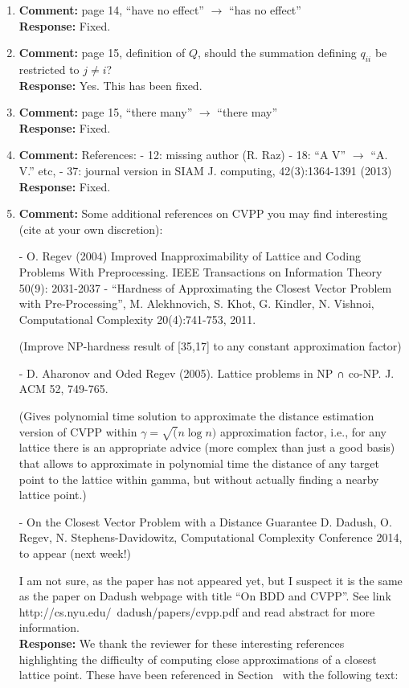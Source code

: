 \documentclass[a4paper,10pt]{article}
\begin{document}
\begin{enumerate}
\item\textbf{Comment:}  
page 14, ``have no effect'' $\to$ ``has no effect'' 
\\\textbf{Response:}
Fixed.

\item\textbf{Comment:}  
page 15, definition of $Q$, should the summation defining $q_{ii}$ be restricted to $j\neq i$? 
\\\textbf{Response:}
Yes. This has been fixed.

\item\textbf{Comment:}  
page 15, ``there many'' $\to$ ``there may'' 
\\\textbf{Response:}
Fixed.

\item\textbf{Comment:}  
References: 
- 12: missing author (R. Raz) 
- 18: ``A V'' $\to$ ``A. V.'' etc, 
- 37: journal version in SIAM J. computing, 42(3):1364-1391 (2013) 
\\\textbf{Response:}
Fixed.

\item\textbf{Comment:}  
Some additional references on CVPP you may find interesting 
(cite at your own discretion): 

- O. Regev (2004) Improved Inapproximability of Lattice and Coding Problems With Preprocessing. IEEE Transactions on Information Theory 50(9): 2031-2037 
- ``Hardness of Approximating the Closest Vector Problem with Pre-Processing'', M. Alekhnovich, S. Khot, G. Kindler, N. Vishnoi, Computational Complexity 20(4):741-753, 2011. 

(Improve NP-hardness result of [35,17] to any constant approximation factor) 

- D. Aharonov and Oded Regev (2005). Lattice problems in NP ∩ co-NP. J. ACM 52, 749-765. 

(Gives polynomial time solution to approximate the distance estimation version of CVPP within $\gamma=\sqrt(n \log n)$ approximation factor, i.e., for any lattice there is an appropriate advice (more complex than just a good basis) that allows to approximate in polynomial time the distance of any target point to the lattice within gamma, but without actually finding a nearby lattice point.) 

- On the Closest Vector Problem with a Distance Guarantee 
D. Dadush, O. Regev, N. Stephens-Davidowitz, Computational Complexity Conference 2014, to appear (next week!) 

I am not sure, as the paper has not appeared yet, but I suspect it is the same as the paper on Dadush webpage with title ``On BDD and CVPP''. 
See link 
http://cs.nyu.edu/~dadush/papers/cvpp.pdf 
and read abstract for more information.
\\\textbf{Response:}
We thank the reviewer for these interesting references highlighting the difficulty of computing close approximations of a closest lattice point.  These have been referenced in Section~ with the following text:


\end{enumerate}
\end{document}
